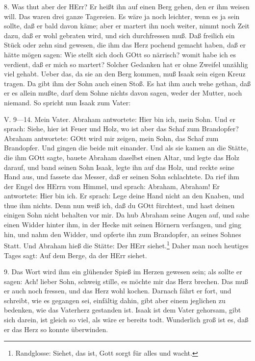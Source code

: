 8. Was thut aber der HErr? Er heißt ihn auf einen Berg gehen, den er ihm weisen will. Das waren drei ganze Tagereien. Es wäre ja noch leichter, wenn es ja sein sollte, daß er bald davon käme; aber er martert ihn noch weiter, nimmt noch Zeit dazu, daß er wohl gebraten wird, und sich durchfressen muß. Daß freilich ein Stück oder zehn sind gewesen, die ihm das Herz pochend gemacht haben, daß er hätte mögen sagen: Wie stellt sich doch GOtt so närrisch? womit habe ich es verdient, daß er mich so martert? Solcher Gedanken hat er ohne Zweifel unzählig viel gehabt. Ueber das, da sie an den Berg kommen, muß Isaak sein eigen Kreuz tragen. Da gibt ihm der Sohn auch einen Stoß. Es hat ihm auch wehe gethan, daß er es allein mußte, darf dem Sohne nichts davon sagen, weder der Mutter, noch niemand. So spricht nun Isaak zum Vater:

\begin{schriftzitat}
V. 9—14. Mein Vater. Abraham antwortete: Hier bin ich, mein Sohn. Und er sprach: Siehe, hier ist Feuer und Holz, wo ist aber das Schaf zum Brandopfer? Abraham antwortete: GOtt
wird mir zeigen, mein Sohn, das Schaf zum Brandopfer. Und gingen die beide mit einander. Und als sie kamen an die Stätte, die ihm GOtt sagte, bauete Abraham daselbst einen Altar, und legte das Holz darauf, und band seinen Sohn Isaak, legte ihn auf das Holz, und reckte seine Hand aus, und fassete das Messer, daß er seinen Sohn schlachtete. Da rief ihm der Engel des HErrn vom Himmel, und sprach: Abraham, Abraham! Er antwortete: Hier bin ich. Er sprach: Lege deine Hand nicht an den Knaben, und thue ihm nichts. Denn nun weiß ich, daß du GOtt fürchtest, und hast deinen einigen Sohn nicht behalten vor mir. Da hub Abraham seine Augen auf, und sahe einen Widder hinter ihm, in der Hecke mit seinen Hörnern verfangen, und ging hin, und nahm den Widder, und opferte ihn zum Brandopfer, an seines Sohnes Statt. Und Abraham hieß die Stätte: Der HErr siehet.\footnote{Randglosse: Siehet, das ist, Gott sorgt für alles und wacht.} Daher man noch heutiges Tages sagt: Auf dem Berge, da der HErr siehet.
\end{schriftzitat}

9. Das Wort wird ihm ein glühender Spieß im Herzen gewesen sein; als sollte er sagen: Ach! lieber Sohn, schweig stille, es möchte mir das Herz brechen. Das muß er auch noch fressen, und das Herz wohl kochen. Darnach fährt er fort, und schreibt, wie es gegangen sei, einfältig dahin, gibt aber einem jeglichen zu bedenken, wie das Vaterherz gestanden ist. Isaak ist dem Vater gehorsam, gibt sich darein, ist gleich so viel, als wäre er bereits todt. Wunderlich groß ist es, daß er das Herz so konnte überwinden.

